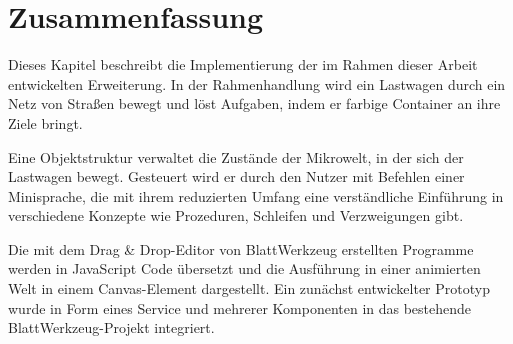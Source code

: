 \section{Zusammenfassung}
\label{sec:implementation:summary}

Dieses Kapitel beschreibt die Implementierung der im Rahmen dieser Arbeit entwickelten Erweiterung. In der Rahmenhandlung wird ein Lastwagen durch ein Netz von Straßen bewegt und löst Aufgaben, indem er farbige Container an ihre Ziele bringt.

Eine Objektstruktur verwaltet die Zustände der Mikrowelt, in der sich der Lastwagen bewegt. Gesteuert wird er durch den Nutzer mit Befehlen einer Minisprache, die mit ihrem reduzierten Umfang eine verständliche Einführung in verschiedene Konzepte wie Prozeduren, Schleifen und Verzweigungen gibt.

Die mit dem Drag \& Drop-Edi\-tor von BlattWerkzeug erstellten Programme werden in JavaScript Code übersetzt und die Ausführung in einer animierten Welt in einem Can\-vas-Ele\-ment dargestellt. Ein zunächst entwickelter Prototyp wurde in Form eines Service und mehrerer Komponenten in das bestehende Blatt\-Werk\-zeug-Pro\-jekt integriert.
